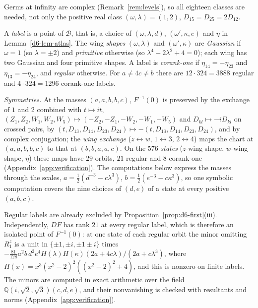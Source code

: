 Germs at infinity are complex (Remark~\ref{rem:levels}), so all eighteen classes are needed, not
only the positive real class $(\omega,\lambda)=(1,2)$, $D_{15}=D_{25}=2D_{12}$.

\begin{definition}\label{d6-def-labels}
A \emph{label} is a point of $\mathcal B$, that is, a choice of $(\omega,\lambda,d)$,
$(\omega',\kappa,e)$ and $\eta$ in Lemma~\ref{d6-lem-atlas}.  The wing \emph{shapes}
$(\omega,\lambda)$ and $(\omega',\kappa)$ are \emph{Gaussian} if $\omega=1$ (so $\lambda=\pm2$) and
\emph{primitive} otherwise (so $\lambda^4-2\lambda^2+4=0$); each wing has two Gaussian and four
primitive shapes.  A label is \emph{corank-one} if $\eta_{14}=-\eta_{23}$ and
$\eta_{13}=-\eta_{24}$, and \emph{regular} otherwise.  For $a\ne4c\ne b$ there are
$12\cdot324=3888$ regular and $4\cdot324=1296$ corank-one labels.
\end{definition}

\emph{Symmetries.}  At the masses $(a,a,b,b,c)$, $F^{-1}(0)$ is preserved by the exchange of $1$
and $2$ combined with $t\mapsto it$, $(Z_1,Z_2,W_1,W_2,W_5)\mapsto(-Z_2,-Z_1,-W_2,-W_1,-W_5)$ and
$D_{kl}\mapsto-iD_{kl}$ on crossed pairs, by $(t,D_{13},D_{14},D_{23},D_{24})\mapsto
-(t,D_{13},D_{14},D_{23},D_{24})$, and by complex conjugation; the \emph{wing exchange}
($z\leftrightarrow w$, $1\leftrightarrow3$, $2\leftrightarrow4$) maps the chart at $(a,a,b,b,c)$ to
that at $(b,b,a,a,c)$.  On the $576$ \emph{states} ($z$-wing shape, $w$-wing shape, $\eta$) these
maps have $29$ orbits, $21$ regular and $8$ corank-one (Appendix~\ref{app:verification}).  The
computations below express the masses through the scales, $a=\frac12(d^{-3}-c\lambda^3)$,
$b=\frac12(e^{-3}-c\kappa^3)$, so one symbolic computation covers the nine choices of $(d,e)$ of a
state at every positive $(a,b,c)$.

\begin{remark}\label{d6-rem-regular}
Regular labels are already excluded by Proposition~\ref{prop:d6-first}(iii).  Independently, $DF$
has rank $21$ at every regular label, which is therefore an isolated point of $F^{-1}(0)$: at one
state of each regular orbit the minor omitting $R^z_1$ is a unit in $\{\pm1,\pm i,\pm1\pm i\}$
times $-\frac{81}{128}a^2b\,d^2e^4H(\lambda)H(\kappa)(2a+4c\lambda)/(2a+c\lambda^3)$, where
$H(x)=x^3(x^2-2)^2((x^2-2)^2+4)$, and this is nonzero on finite labels.  The minors are computed
in exact arithmetic over the field $\mathbb Q(i,\sqrt2,\sqrt3)(c,d,e)$, and their nonvanishing is
checked with resultants and norms (Appendix~\ref{app:verification}).
\end{remark}

